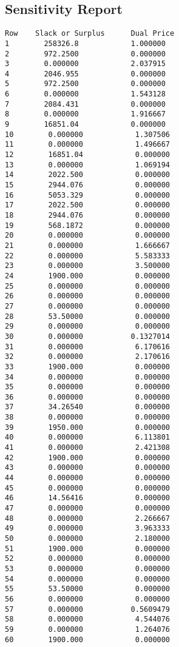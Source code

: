 \documentclass[12pt]{article}
\begin{document}
\begin{appendices}
\subsection{Sensitivity Report}
\begin{lstlisting}
Row    Slack or Surplus      Dual Price
1        258326.8            1.000000
2        972.2500            0.000000
3        0.000000            2.037915
4        2046.955            0.000000
5        972.2500            0.000000
6        0.000000            1.543128
7        2084.431            0.000000
8        0.000000            1.916667
9        16851.04            0.000000
10        0.000000            1.307506
11        0.000000            1.496667
12        16851.04            0.000000
13        0.000000            1.069194
14        2022.500            0.000000
15        2944.076            0.000000
16        5053.329            0.000000
17        2022.500            0.000000
18        2944.076            0.000000
19        568.1872            0.000000
20        0.000000            0.000000
21        0.000000            1.666667
22        0.000000            5.583333
23        0.000000            3.500000
24        1900.000            0.000000
25        0.000000            0.000000
26        0.000000            0.000000
27        0.000000            0.000000
28        53.50000            0.000000
29        0.000000            0.000000
30        0.000000           0.1327014
31        0.000000            6.170616
32        0.000000            2.170616
33        1900.000            0.000000
34        0.000000            0.000000
35        0.000000            0.000000
36        0.000000            0.000000
37        34.26540            0.000000
38        0.000000            0.000000
39        1950.000            0.000000
40        0.000000            6.113801
41        0.000000            2.421308
42        1900.000            0.000000
43        0.000000            0.000000
44        0.000000            0.000000
45        0.000000            0.000000
46        14.56416            0.000000
47        0.000000            0.000000
48        0.000000            2.266667
49        0.000000            3.963333
50        0.000000            2.180000
51        1900.000            0.000000
52        0.000000            0.000000
53        0.000000            0.000000
54        0.000000            0.000000
55        53.50000            0.000000
56        0.000000            0.000000
57        0.000000           0.5609479
58        0.000000            4.544076
59        0.000000            1.264076
60        1900.000            0.000000

\end{lstlisting}
\end{appendices}
\end{document}
